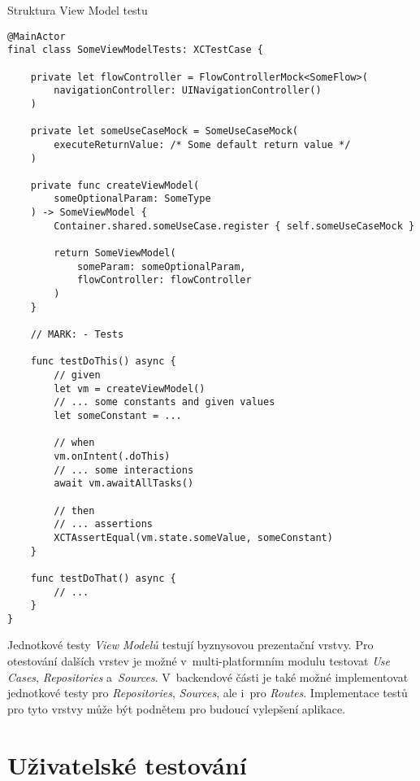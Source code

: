 \begin{listing}
\caption{Struktura View Model testu}\label{code:vm-test-sctructure}
\begin{verbatim}
@MainActor
final class SomeViewModelTests: XCTestCase {

    private let flowController = FlowControllerMock<SomeFlow>(
        navigationController: UINavigationController()
    )
    
    private let someUseCaseMock = SomeUseCaseMock(
        executeReturnValue: /* Some default return value */
    )
    
    private func createViewModel(
        someOptionalParam: SomeType
    ) -> SomeViewModel {
        Container.shared.someUseCase.register { self.someUseCaseMock }
	
        return SomeViewModel(
            someParam: someOptionalParam,
            flowController: flowController
        )
    }
    
    // MARK: - Tests
    
    func testDoThis() async {
        // given
        let vm = createViewModel()
        // ... some constants and given values
        let someConstant = ...
    	
        // when
        vm.onIntent(.doThis)
        // ... some interactions
        await vm.awaitAllTasks()
		
        // then
        // ... assertions
        XCTAssertEqual(vm.state.someValue, someConstant)
    }
    
    func testDoThat() async {
        // ...
    }
}
\end{verbatim}
\end{listing}

Jednotkové testy \emph{View Modelů} testují byznysovou prezentační vrstvy. Pro otestování dalších vrstev je možné v~multi-platformním modulu testovat \emph{Use Cases}, \emph{Repositories} a~\emph{Sources}. V~backendové části je také možné implementovat jednotkové testy pro \emph{Repositories}, \emph{Sources}, ale i~pro \emph{Routes}. Implementace testů pro tyto vrstvy může být podnětem pro budoucí vylepšení aplikace.

\section{Uživatelské testování}

